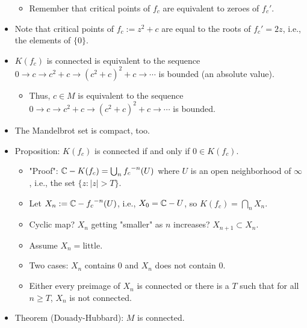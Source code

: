 \documentclass[../main.tex]{subfiles}
\begin{document}
\begin{itemize}
\begin{itemize}
        \item Remember that critical points of $f_c$ are equivalent to zeroes of $f_c'$.
    \end{itemize}
    \item Note that critical points of $f_c:=z^2+c$ are equal to the roots of $f_c'=2z$, i.e., the elements of $\{0\}$.
    \item $K(f_c)$ is connected is equivalent to the sequence $0\to c\to c^2+c\to (c^2+c)^2+c\to\cdots$ is bounded (an absolute value).
    \begin{itemize}
        \item Thus, $c\in M$ is equivalent to the sequence $0\to c\to c^2+c\to (c^2+c)^2+c\to\cdots$ is bounded.
    \end{itemize}
    \item The Mandelbrot set is compact, too.
    \item Proposition: $K(f_c)$ is connected if and only if $0\in K(f_c)$.
    \begin{itemize}
        \item "Proof": $\mathbb{C}-K(f_c)=\bigcup_n{f_c}^{-n}(U)$ where $U$ is an open neighborhood of $\infty$, i.e., the set $\{z:|z|>T\}$.
        \item Let $X_n:=\mathbb{C}-{f_c}^{-n}(U)$, i.e., $X_0=\mathbb{C}-U$, so $K(f_c)=\bigcap_nX_n$.
        \item Cyclic map? $X_n$ getting "smaller" as $n$ increases? $X_{n+1}\subset X_n$.
        \item Assume $X_n=\text{little}$.
        \item Two cases: $X_n$ contains 0 and $X_n$ does not contain 0.
        \item Either every preimage of $X_n$ is connected or there is a $T$ such that for all $n\geq T$, $X_n$ is not connected.
    \end{itemize}
    \item Theorem (Douady-Hubbard): $M$ is connected.
\end{itemize}
\end{document}
